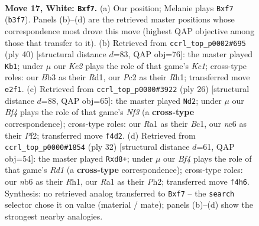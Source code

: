 \documentclass[11pt]{article}
\begin{document}
\clearpage

\begin{figure}[p]\centering
\begin{subfigure}{0.46\textwidth}\centering
\resizebox{\linewidth}{!}{%
\newchessgame
\chessboard[
  setfen={2kr2r1/1pp1ppbp/1nn3p1/p7/5B1P/NB3P2/PPP1KP2/R5R1 w - - 2 17},
  showmover=false,
  pgfstyle=straightmove, color=movearrow, markmove={b3-f7}
]}
\caption{}
\end{subfigure}\hfill
\begin{subfigure}{0.46\textwidth}\centering
\resizebox{\linewidth}{!}{%
\newchessgame
\chessboard[
  setfen={3rk2r/1p3pp1/p1n1n3/2bpP1p1/8/5NB1/PPP1B1PP/2KR3R w k - 2 21},
  showmover=false,
  pgfstyle=straightmove, color=movearrow, markmove={c1-b1}
]}
\caption{}
\end{subfigure}
\\[4pt]
\begin{subfigure}{0.46\textwidth}\centering
\resizebox{\linewidth}{!}{%
\newchessgame
\chessboard[
  setfen={r6r/pb1k1ppp/1p1p1n2/4p3/4P3/1P3N1P/1PP2PP1/R1BKR3 w - - 0 14},
  showmover=false,
  pgfstyle=straightmove, color=movearrow, markmove={f3-d2}
]}
\caption{}
\end{subfigure}\hfill
\begin{subfigure}{0.46\textwidth}\centering
\resizebox{\linewidth}{!}{%
\newchessgame
\chessboard[
  setfen={r2r2k1/5ppp/bpn2n2/2p5/4pP2/1BN1B3/PPP3PP/3RK2R w K - 4 17},
  showmover=false,
  pgfstyle=straightmove, color=movearrow, markmove={d1-d8}
]}
\caption{}
\end{subfigure}
\caption{\textbf{Move 17, White: \texttt{Bxf7}.} (a) Our position; Melanie plays \texttt{Bxf7} (\texttt{b3f7}). Panels (b)--(d) are the retrieved master positions whose correspondence most drove this move (highest QAP objective among those that transfer to it). (b) Retrieved from \texttt{ccrl\_top\_p0002\#695} (ply 40) [structural distance $d$=83, QAP obj=76]: the master played \texttt{Kb1}; under $\mu$ our \emph{Ke2} plays the role of that game's \emph{Kc1}; cross-type roles: our \emph{B}b3 as their \emph{R}d1, our \emph{P}c2 as their \emph{R}h1; transferred move \texttt{e2f1}. (c) Retrieved from \texttt{ccrl\_top\_p0000\#3922} (ply 26) [structural distance $d$=88, QAP obj=65]: the master played \texttt{Nd2}; under $\mu$ our \emph{Bf4} plays the role of that game's \emph{Nf3} (a \textbf{cross-type} correspondence); cross-type roles: our \emph{R}a1 as their \emph{B}c1, our \emph{n}c6 as their \emph{P}f2; transferred move \texttt{f4d2}. (d) Retrieved from \texttt{ccrl\_top\_p0000\#1854} (ply 32) [structural distance $d$=61, QAP obj=54]: the master played \texttt{Rxd8+}; under $\mu$ our \emph{Bf4} plays the role of that game's \emph{Rd1} (a \textbf{cross-type} correspondence); cross-type roles: our \emph{n}b6 as their \emph{R}h1, our \emph{R}a1 as their \emph{P}h2; transferred move \texttt{f4h6}. Synthesis: no retrieved analog transferred to \texttt{Bxf7} -- the \texttt{search} selector chose it on value (material / mate); panels (b)--(d) show the strongest nearby analogies.}
\label{fig:thought-m32}
\end{figure}
\end{document}
